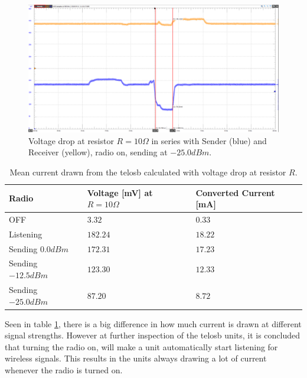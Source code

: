 \begin{figure}[H]
	\centering
	\includegraphics[width=1\linewidth]{implementation/energylab/fig/radioOn_sendLowSignal.png}
	\caption{Voltage drop at resistor $R=10\Omega$ in series with Sender (blue) and Receiver (yellow), radio on, sending at $-25.0dBm$.}
	\label{fig:radioOn_sendLowSignal}
\end{figure}

\begin{table}[H]
	\centering
	\begin{tabularx}{\linewidth}{|X|X|X|}
		\hline
		Radio				& Voltage [mV] at $R=10\Omega$	& Converted Current [mA]	\\ \hline
		OFF					& $3.32$						& $0.33$					\\ \hline
		Listening			& $182.24$						& $18.22$					\\ \hline
		Sending $0.0dBm$	& $172.31$						& $17.23$					\\ \hline
		Sending $-12.5dBm$	& $123.30$						& $12.33$					\\ \hline
		Sending $-25.0dBm$	& $87.20$						& $8.72$					\\ \hline
	\end{tabularx}
	\caption{Mean current drawn from the telosb calculated with voltage drop at resistor $R$.}
	\label{tab:signalStrengthEnergyConsumption}
\end{table}

\noindent Seen in table \ref{tab:signalStrengthEnergyConsumption}, there is a big difference in how much current is drawn at different signal strengths. However at further inspection of the telosb units, it is concluded that turning the radio on, will make a unit automatically start listening for wireless signals. This results in the units always drawing a lot of current whenever the radio is turned on.


